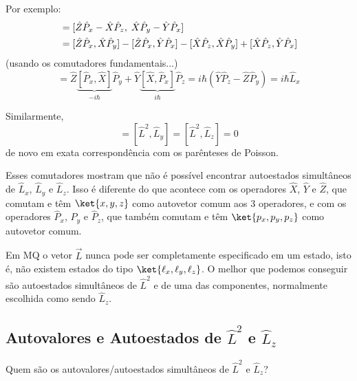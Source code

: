Por exemplo:
\begin{align}
    [\hat{L}_y, \hat{L}_z] &= [\hat{Z}\hat{P}_x - \hat{X}\hat{P}_z, \; \hat{X}\hat{P}_y - \hat{Y}\hat{P}_x] \notag \\
    &= [\hat{Z}\hat{P}_x, \hat{X}\hat{P}_y] - [\hat{Z}\hat{P}_x, \hat{Y}\hat{P}_x] - [\hat{X}\hat{P}_z, \hat{X}\hat{P}_y] + [\hat{X}\hat{P}_z, \hat{Y}\hat{P}_x] \notag \\
\label{eq:aula19_exemplo_comutador_1}
\end{align}
(usando os comutadores fundamentais...)
\begin{equation}
    = \hat{Z}\underbrace{[\hat{P}_x, \hat{X}]}_{-i\hbar}\hat{P}_y + \hat{Y}\underbrace{[\hat{X}, \hat{P}_x]}_{i\hbar}\hat{P}_z = i\hbar(\hat{Y}\hat{P}_z - \hat{Z}\hat{P}_y) = i\hbar \hat{L}_x
\label{eq:aula19_exemplo_comutador_2}
\end{equation}

Similarmente,
\begin{equation}
    [\hat{L}^2, \hat{L}_x] = [\hat{L}^2, \hat{L}_y] = [\hat{L}^2, \hat{L}_z] = 0
\label{eq:aula19_comutador_L2}
\end{equation}
de novo em exata correspondência com os parênteses de Poisson.

Esses comutadores mostram que não é possível encontrar autoestados simultâneos de $\hat{L}_x$, $\hat{L}_y$ e $\hat{L}_z$. Isso é diferente do que acontece com os operadores $\hat{X}$, $\hat{Y}$ e $\hat{Z}$, que comutam e têm $\ket{x,y,z}$ como autovetor comum aos 3 operadores, e com os operadores $\hat{P}_x$, $\hat{P}_y$ e $\hat{P}_z$, que também comutam e têm $\ket{p_x,p_y,p_z}$ como autovetor comum.

Em MQ o vetor $\vec{L}$ nunca pode ser completamente especificado em um estado, isto é, não existem estados do tipo $\ket{\ell_x, \ell_y, \ell_z}$. O melhor que podemos conseguir são autoestados simultâneos de $\hat{L}^2$ e de uma das componentes, normalmente escolhida como sendo $\hat{L}_z$.

\subsection*{Autovalores e Autoestados de $\hat{L}^2$ e $\hat{L}_z$}

Quem são os autovalores/autoestados simultâneos de $\hat{L}^2$ e $\hat{L}_z$?

